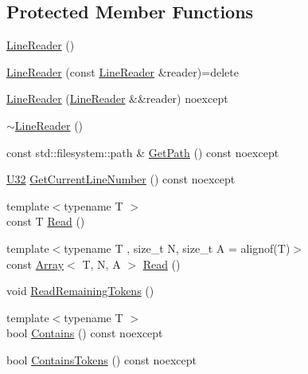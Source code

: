 \subsection*{Protected Member Functions}
\begin{DoxyCompactItemize}
\item 
\mbox{\hyperlink{classmage_1_1_line_reader_ab4a46321d7ea3ecda2d6390c78a7285b}{Line\+Reader}} ()
\item 
\mbox{\hyperlink{classmage_1_1_line_reader_ae4f871bebae110704b34c0bd88460639}{Line\+Reader}} (const \mbox{\hyperlink{classmage_1_1_line_reader}{Line\+Reader}} \&reader)=delete
\item 
\mbox{\hyperlink{classmage_1_1_line_reader_ae90c546a98e113a48ca1c94b854a4866}{Line\+Reader}} (\mbox{\hyperlink{classmage_1_1_line_reader}{Line\+Reader}} \&\&reader) noexcept
\item 
\mbox{\hyperlink{classmage_1_1_line_reader_ad9753ea392ebe5b3867852d3392fb1e7}{$\sim$\+Line\+Reader}} ()
\item 
const std\+::filesystem\+::path \& \mbox{\hyperlink{classmage_1_1_line_reader_a9740b3cecdcf5a27c696a08eef3b09da}{Get\+Path}} () const noexcept
\item 
\mbox{\hyperlink{namespacemage_a41c104c036fba3756a74e19f793eeaa1}{U32}} \mbox{\hyperlink{classmage_1_1_line_reader_aa0ed768e2799b74f2341c56fc6ac4969}{Get\+Current\+Line\+Number}} () const noexcept
\item 
{\footnotesize template$<$typename T $>$ }\\const T \mbox{\hyperlink{classmage_1_1_line_reader_a9bbad433ab93ce012aec7155adafbedb}{Read}} ()
\item 
{\footnotesize template$<$typename T , size\+\_\+t N, size\+\_\+t A = alignof(\+T)$>$ }\\const \mbox{\hyperlink{structmage_1_1_array}{Array}}$<$ T, N, A $>$ \mbox{\hyperlink{classmage_1_1_line_reader_a208eb25a7715761178317eec72c93c75}{Read}} ()
\item 
void \mbox{\hyperlink{classmage_1_1_line_reader_aa12f309eaa7aace705ff4e0199c4fbfc}{Read\+Remaining\+Tokens}} ()
\item 
{\footnotesize template$<$typename T $>$ }\\bool \mbox{\hyperlink{classmage_1_1_line_reader_a89a31254af144fd0c9e7f684cdaa28e7}{Contains}} () const noexcept
\item 
bool \mbox{\hyperlink{classmage_1_1_line_reader_aeb88e4082cfe3ae1ff84a82fcde26298}{Contains\+Tokens}} () const noexcept
\end{DoxyCompactItemize}
